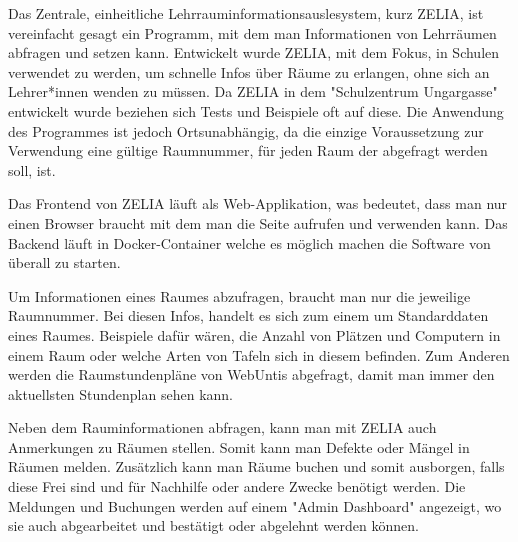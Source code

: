 

Das Zentrale, einheitliche Lehrrauminformationsauslesystem, kurz ZELIA, ist vereinfacht gesagt ein Programm, mit dem man Informationen von Lehrräumen abfragen und setzen kann. Entwickelt wurde ZELIA, mit dem Fokus, in Schulen verwendet zu werden, um schnelle Infos über Räume zu erlangen, ohne sich an Lehrer*innen wenden zu müssen. Da ZELIA in dem "Schulzentrum Ungargasse" entwickelt wurde beziehen sich Tests und Beispiele oft auf diese. Die Anwendung des Programmes ist jedoch Ortsunabhängig, da die einzige Voraussetzung zur Verwendung eine gültige Raumnummer, für jeden Raum der abgefragt werden soll, ist. 

Das Frontend von ZELIA läuft als Web-Applikation, was bedeutet, dass man nur einen Browser braucht mit dem man die Seite aufrufen und verwenden kann. Das Backend läuft in Docker-Container welche es möglich machen die Software von überall zu starten.

Um Informationen eines Raumes abzufragen, braucht man nur die jeweilige Raumnummer. Bei diesen Infos, handelt es sich zum einem um Standarddaten eines Raumes. Beispiele dafür wären, die Anzahl von Plätzen und Computern in einem Raum oder welche Arten von Tafeln sich in diesem befinden. Zum Anderen werden die Raumstundenpläne von WebUntis abgefragt, damit man immer den aktuellsten Stundenplan sehen kann.

Neben dem Rauminformationen abfragen, kann man mit ZELIA auch Anmerkungen zu Räumen stellen. Somit kann man Defekte oder Mängel in Räumen melden. Zusätzlich kann man Räume buchen und somit ausborgen, falls diese Frei sind und für Nachhilfe oder andere Zwecke benötigt werden. Die Meldungen und Buchungen werden auf einem "Admin Dashboard" angezeigt, wo sie auch abgearbeitet und bestätigt oder abgelehnt werden können. 

